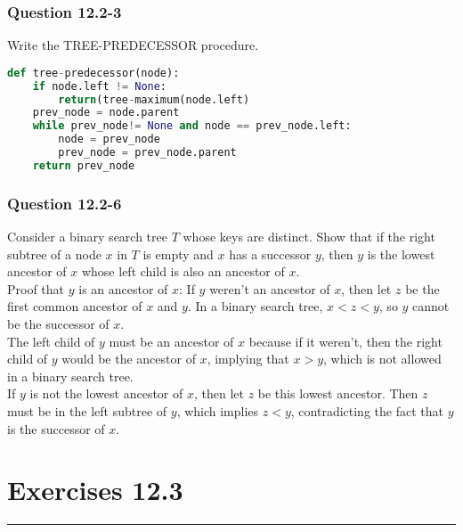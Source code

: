 \documentclass[11pt]{article}
\begin{document}
\subsubsection*{Question 12.2-3}\nointerlineskip
Write the TREE-PREDECESSOR procedure.\\

\begin{minipage}{6in}
\begin{lstlisting}[language=Python]
def tree-predecessor(node):
    if node.left != None:
        return(tree-maximum(node.left)
    prev_node = node.parent
    while prev_node!= None and node == prev_node.left:
        node = prev_node
        prev_node = prev_node.parent
    return prev_node

\end{lstlisting}
\end{minipage}


\subsubsection*{Question 12.2-6}\nointerlineskip
Consider a binary search tree $T$ whose keys are distinct. Show that if the right subtree of a node $x$ in $T$  is empty and $x$ has a successor $y$, then $y$ is the lowest ancestor of $x$ whose left child is also an ancestor of $x$.\\

Proof that $y$ is an ancestor of $x$: If $y$ weren't an ancestor of $x$, then let $z$ be the first common ancestor of $x$ and $y$. In a binary search tree, $x < z < y$, so $y$ cannot be the successor of $x$.\\

The left child of $y$ must be an ancestor of $x$ because if it weren't, then the right child of $y$ would be the ancestor of $x$, implying that $x>y$, which is not allowed in a binary search tree. \\

If $y$ is not the lowest ancestor of $x$, then let $z$ be this lowest ancestor. Then $z$ must be in the left subtree of $y$, which implies $z < y$, contradicting the fact that $y$ is the successor of $x$.\\


\section*{Exercises 12.3}\nointerlineskip
\noindent \rule{\linewidth}{0.01pt}\\
\end{document}
